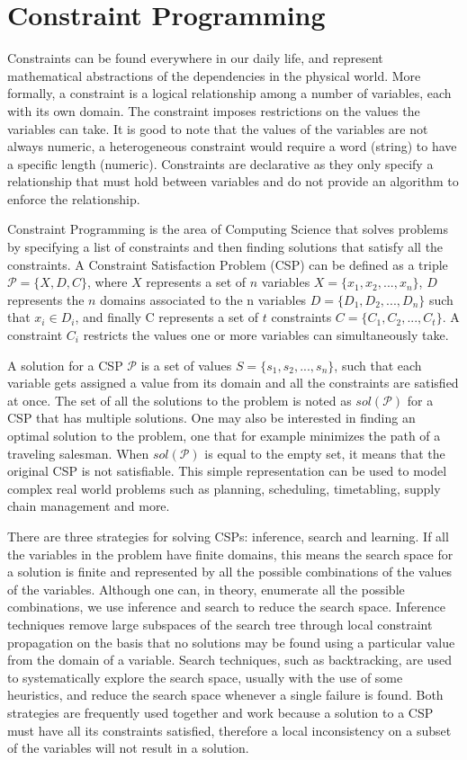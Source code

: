 \documentclass{l4proj}
\begin{document}
\section{Constraint Programming}
\noindent Constraints can be found everywhere in our daily life, and represent mathematical abstractions of the dependencies in the physical world. More formally, a constraint is a logical relationship among a number of variables, each with its own domain. The constraint imposes restrictions on the values the variables can take. It is good to note that the values of the variables are not always numeric, a heterogeneous constraint would require a word (string) to have a specific length (numeric). Constraints are declarative as they only specify a relationship that must hold between variables and do not provide an algorithm to enforce the relationship.

\noindent Constraint Programming is the area of Computing Science that solves problems by specifying a list of constraints and then finding solutions that satisfy all the constraints. A Constraint Satisfaction Problem (CSP) can be defined as a triple $\mathcal{P} = \{X, D, C\}$, where $X$ represents a set of $n$ variables $X = \{x_1, x_2,..., x_n\}$, $D$ represents the $n$ domains associated to the n variables $D = \{D_1, D_2,..., D_n\}$  such that $x_i \in D_i$, and finally C represents a set of $t$ constraints $C =  \{C_1, C_2,..., C_t\}$. A constraint $C_i$ restricts the values one or more variables can simultaneously take.

\noindent A solution for a CSP $\mathcal{P}$ is a set of values $S = \{s_1, s_2,..., s_n\}$, such that each variable gets assigned a value from its domain and all the constraints are satisfied at once. The set of all the solutions to the problem is noted as $sol(\mathcal{P})$ for a CSP that has multiple solutions. One may also be interested in finding an optimal solution to the problem, one that for example minimizes the path of a traveling salesman. When $sol(\mathcal{P})$ is equal to the empty set, it means that the original CSP is not satisfiable. This simple representation can be used to model complex real world problems such as planning, scheduling, timetabling, supply chain management and more.

\noindent There are three strategies for solving CSPs: inference, search and learning. If all the variables in the problem have finite domains, this means the search space for a solution is finite and represented by all the possible combinations of the values of the variables. Although one can, in theory, enumerate all the possible combinations, we use inference and search to reduce the search space. Inference techniques remove large subspaces of the search tree through local constraint propagation on the basis that no solutions may be found using a particular value from the domain of a variable. Search techniques, such as backtracking, are used to systematically explore the search space, usually with the use of some heuristics, and reduce the search space whenever a single failure is found. Both strategies are frequently used together and work because a solution to a CSP must have all its constraints satisfied, therefore a local inconsistency on a subset of the variables will not result in a solution.
\end{document}
